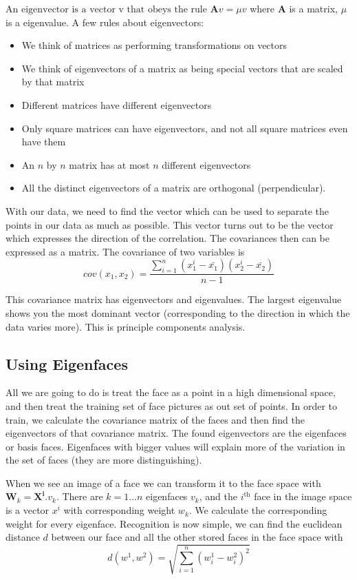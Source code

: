 \documentclass{article}
\begin{document}
		$\text{An eigenvector is a vector v that obeys the rule } \mathbf{A}v = \mu v$ where $\mathbf{A}$ is a matrix, $\mu$ is a eigenvalue. A few rules about eigenvectors:
		\begin{itemize}
			\item We think of matrices as performing transformations on vectors
			\item We think of eigenvectors of a matrix as being special vectors that are scaled by that matrix
			\item Different matrices have different eigenvectors
			\item Only square matrices can have eigenvectors, and not all square matrices even have them
			\item An $n$ by $n$ matrix has at most $n$ different eigenvectors
			\item All the distinct eigenvectors of a matrix are orthogonal (perpendicular).
		\end{itemize}
		
	With our data, we need to find the vector which can be used to separate the points in our data as much as possible. This vector turns out to be the vector which expresses the direction of the correlation. The covariances then can be expressed as a matrix. The covariance of two variables is
	\[ cov(x_{1}, x_{2}) = \frac{\sum_{i=1}^{n}(x_{1}^{i} - \bar{x_{1}})(x_{2}^{i} - \bar{x_{2}})}{n - 1} \]	
	
	This covariance matrix has eigenvectors and eigenvalues. The largest eigenvalue shows you the most dominant vector (corresponding to the direction in which the data varies more). This is principle components analysis.
	
	\subsection{Using Eigenfaces}
	All we are going to do is treat the face as a point in a high dimensional space, and then treat the training set of face pictures as out set of points. In order to train, we calculate the covariance matrix of the faces and then find the eigenvectors of that covariance matrix. The found eigenvectors are the eigenfaces or basis faces. Eigenfaces with bigger values will explain more of the variation in the set of faces (they are more distinguishing).
	
	\par
	When we see an image of a face we can transform it to the face space with $\mathbf{W}_{k} = \mathbf{X}^{\mathbf{i}} . \mathit{v}_{k}$. There are $k=1...n$ eigenfaces $v_{k}$, and the $i^{\text{th}}$ face in the image space is a vector $x^{i}$ with corresponding weight $w_{k}$. We calculate the corresponding weight for every eigenface. Recognition is now simple, we can find the euclidean distance $d$ between our face and all the other stored faces in the face space with \[ d(w^{1}, w^{2}) = \sqrt{\sum_{i=1}^{n}(w_{i}^{1} - w_{i}^{2})^{2}} \]
	
\end{document}
